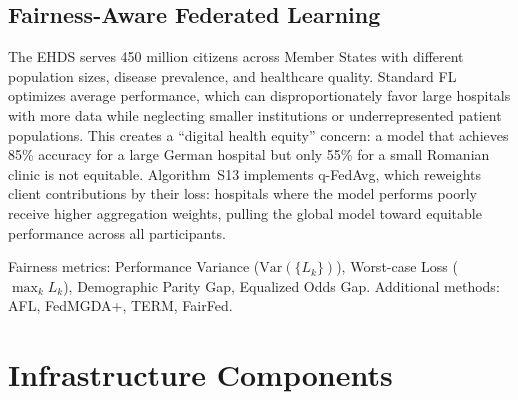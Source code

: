 \documentclass[conference]{IEEEtran}
\begin{document}
\subsection{Fairness-Aware Federated Learning}

The EHDS serves 450 million citizens across Member States with different population sizes, disease prevalence, and healthcare quality. Standard FL optimizes average performance, which can disproportionately favor large hospitals with more data while neglecting smaller institutions or underrepresented patient populations. This creates a ``digital health equity'' concern: a model that achieves 85\% accuracy for a large German hospital but only 55\% for a small Romanian clinic is not equitable. Algorithm~S13 implements q-FedAvg, which reweights client contributions by their loss: hospitals where the model performs poorly receive higher aggregation weights, pulling the global model toward equitable performance across all participants.

\begin{figure}[htbp]
\centering
{}
\end{figure}

Fairness metrics: Performance Variance ($\text{Var}(\{L_k\})$), Worst-case Loss ($\max_k L_k$), Demographic Parity Gap, Equalized Odds Gap. Additional methods: AFL, FedMGDA+, TERM, FairFed.

\section{Infrastructure Components}
\label{sec:infrastructure}
\end{document}
